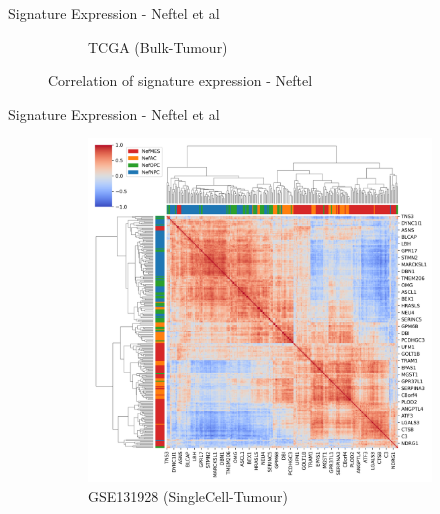 \documentclass[aspectratio=169,9pt]{beamer}
\begin{document}
\begin{frame}{Signature Expression - Neftel et al}
\begin{adjustwidth}{-5cm}{-5cm}
\begin{figure}
\begin{subfigure}[c]{0.48\textwidth}
                    \caption{TCGA (Bulk-Tumour)}
                \end{subfigure}
                \caption{Correlation of signature expression - Neftel}
            \end{figure}
        \end{adjustwidth}
    \end{frame}

    \begin{frame}{Signature Expression - Neftel et al}
        \begin{adjustwidth}{-5cm}{-5cm}
            \centering
            \begin{figure}\ContinuedFloat
                \centering
                \begin{subfigure}[c]{0.48\textwidth}
                    \centering
                    \includegraphics[width=\textwidth]{GSM3828672_Corrplot_Nef}
                    \caption{GSE131928 (SingleCell-Tumour)}
                \end{subfigure}
                \begin{subfigure}[c]{0.48\textwidth}
                    \centering

\end{subfigure}
\end{figure}
\end{adjustwidth}
\end{frame}
\end{document}
